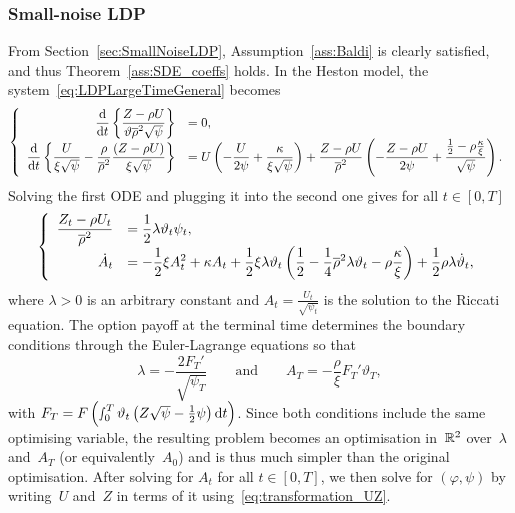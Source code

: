 \subsubsection{Small-noise LDP}
From Section~\ref{sec:SmallNoiseLDP},
Assumption~\ref{ass:Baldi} is clearly satisfied, 
and thus Theorem~\ref{ass:SDE_coeffs} holds.
In the Heston model, the system~\eqref{eq:LDPLargeTimeGeneral} becomes
\begin{equation*}
\left\{
\begin{array}{rl}
\displaystyle \frac{\mathrm{d}}{\mathrm{d} t}\left\{\frac{Z - \rho U}{\vartheta\overline{\rho}^2\sqrt{\psi}}\right\} &= 0,\\
\displaystyle \frac{\mathrm{d}}{\mathrm{d} t}\left\{
\frac{U}{\xi \sqrt{\psi}} - \frac{\rho}{\overline{\rho}^2}\frac{(Z - \rho U)}{\xi\sqrt{\psi}} \right\}
&= \displaystyle U\left(-\frac{U}{2\psi} + \frac{\kappa}{\xi \sqrt{\psi}}\right)
+ \frac{Z - \rho U}{\overline{\rho}^2}\left(-\frac{Z-\rho U}{2\psi} + \frac{\frac{1}{2} - \rho \frac{\kappa}{\xi}}{\sqrt{\psi}}\right).
\end{array}
\right.
\end{equation*}
Solving the first ODE and plugging it into the second one gives for all $t\in[0,T]$
\begin{equation}\label{eq:RiccatiA}
\left\{
\begin{array}{rl}
\displaystyle \frac{Z_t - \rho U_t}{\overline{\rho}^2}
&= \displaystyle \frac{1}{2} \lambda \vartheta_t \psi_t,\\
\displaystyle \dot{A}_t &= 
\displaystyle -\frac{1}{2}\xi A_t^2 + \kappa A_t + \frac{1}{2}\xi \lambda \vartheta_t \left(\frac{1}{2} - \frac{1}{4}\overline{\rho}^2\lambda\vartheta_t - \rho\frac{\kappa}{\xi} \right) + \frac{1}{2}\rho\lambda\dot{\vartheta}_t,
\end{array}
\right.
\end{equation}
where $\lambda>0$ is an arbitrary constant and $A_t = \frac{U_t}{\sqrt{\psi_t}}$ is the solution to the Riccati equation. The option payoff at the terminal time determines the boundary conditions through the Euler-Lagrange equations so that
\[
\lambda = - \frac{2F_T'}{\sqrt{\psi_T}} 
\qquad \text{and} \qquad 
A_T = -\frac{\rho}{\xi}F_T'\vartheta_T,
\]
with $F_T=F\left(\smallint_0^T\vartheta_t\left(Z\sqrt\psi-\frac12\psi\right) \mathrm{d} t\right)$. 
Since both conditions include the same optimising variable, 
the resulting problem becomes an optimisation in~$\mathbb{R}^2$ over~$\lambda$ and~$A_T$ (or equivalently~$A_0$) and is thus much simpler than the original optimisation. 
After solving for $A_t$ for all $t\in[0,T]$, we then solve for $(\varphi,\psi)$ by writing~$U$ and~$Z$ in terms of it using~\eqref{eq:transformation_UZ}. 

